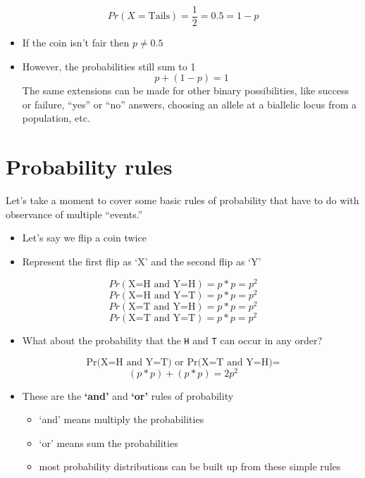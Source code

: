 \documentclass[]{book}
\providecommand{\tightlist}{%
  \setlength{\itemsep}{0pt}\setlength{\parskip}{0pt}}
\begin{document}
\[Pr(X=\text{Tails}) = \frac{1}{2} = 0.5 = 1 - p \]

\begin{itemize}
\item
  If the coin isn't fair then \(p \neq 0.5\)
\item
  However, the probabilities still sum to 1
  \[ p + (1-p) = 1 \]
  The same extensions can be made for other binary possibilities, like success or failure, ``yes'' or ``no'' answers, choosing an allele at a biallelic locus from a population, etc.
\end{itemize}

\hypertarget{probability-rules}{%
\section{Probability rules}\label{probability-rules}}

Let's take a moment to cover some basic rules of probability that have to do with observance of multiple ``events.''

\begin{itemize}
\tightlist
\item
  Let's say we flip a coin twice
\item
  Represent the first flip as `X' and the second flip as `Y'
\end{itemize}

\[ Pr(\text{X=H and Y=H}) = p*p = p^2 \]
\[ Pr(\text{X=H and Y=T}) = p*p = p^2 \]
\[ Pr(\text{X=T and Y=H}) = p*p = p^2 \]
\[ Pr(\text{X=T and Y=T}) = p*p = p^2 \]

\begin{itemize}
\tightlist
\item
  What about the probability that the \texttt{H} and \texttt{T} can occur in any order?
\end{itemize}

\[ \text{Pr(X=H and Y=T) or Pr(X=T and Y=H)} = \]
\[ (p*p) + (p*p) = 2p^{2} \]

\begin{itemize}
\tightlist
\item
  These are the \textbf{`and'} and \textbf{`or'} rules of probability

  \begin{itemize}
  \tightlist
  \item
    `and' means multiply the probabilities
  \item
    `or' means sum the probabilities
  \item
    most probability distributions can be built up from these simple rules
  \end{itemize}
\end{itemize}
\end{document}
